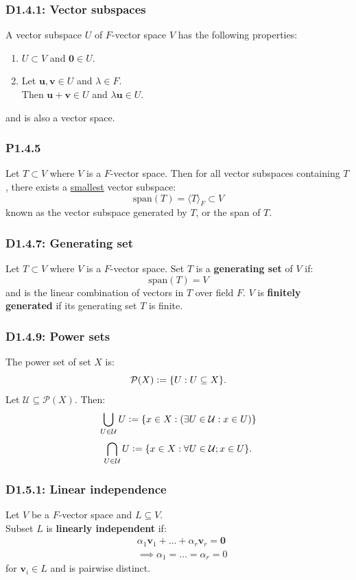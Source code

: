\documentclass{article}
\newcommand{\deq}{\vcentcolon=}
\newcommand{\vc}[1]{\boldsymbol{#1}}
\begin{document}
\begin{multicols*}{3}
\subsubsection*{D1.4.1: Vector subspaces}
A vector subspace $U$ of $F$-vector space $V$
has the following properties:
\begin{enumerate}
    \item $U\subset V$ and $\vc{0}\in U$.
    \item Let $\vc{u},\vc{v}\in U$
    and $\lambda\in F$. \\ Then
    $\vc{u}+\vc{v}\in U$ and $\lambda\vc{u}\in U$.
\end{enumerate}
and is also a vector space.

\subsubsection*{P1.4.5}
Let $T\subset V$ where $V$ is a $F$-vector space.
Then for all vector subspaces containing $T$,
there exists a \underline{smallest} vector subspace:
$$\text{span}(T)=\langle T\rangle_F\subset V$$
known as the vector subspace generated by $T$,
or the span of $T$.

\subsubsection*{D1.4.7: Generating set}
Let $T\subset V$ where $V$ is a $F$-vector space.
Set $T$ is a \textbf{generating set} of $V$ if:
$$\text{span}(T)=V$$
and is the linear combination of vectors in $T$
over field $F$. $V$ is \textbf{finitely generated}
if its generating set $T$ is finite.

\subsubsection*{D1.4.9: Power sets}
The power set of set $X$ is:
$$\mathcal{P}(X)\deq\{U:U\subseteq X\}.$$
Let $\mathcal{U}\subseteq\mathcal{P}(X)$. Then:
$$\bigcup_{U\in\mathcal{U}}U
\deq\{x\in X:(\exists U\in\mathcal{U}:x\in U)\}$$
$$\bigcap_{U\in\mathcal{U}}U
\deq\{x\in X:\forall U\in\mathcal{U};x\in U\}.$$

\subsubsection*{D1.5.1: Linear independence}
Let $V$ be a $F$-vector space and $L\subseteq V$. \\
Subset $L$ is \textbf{linearly independent} if:
\begin{align*}
    &\alpha_1\vc{v}_1+\dots+\alpha_r\vc{v}_r=\vc{0} \\
    &\implies \alpha_1=\dots=\alpha_r=0
\end{align*}
for $\vc{v}_i\in L$
and is pairwise distinct.


\end{multicols*}
\end{document}
